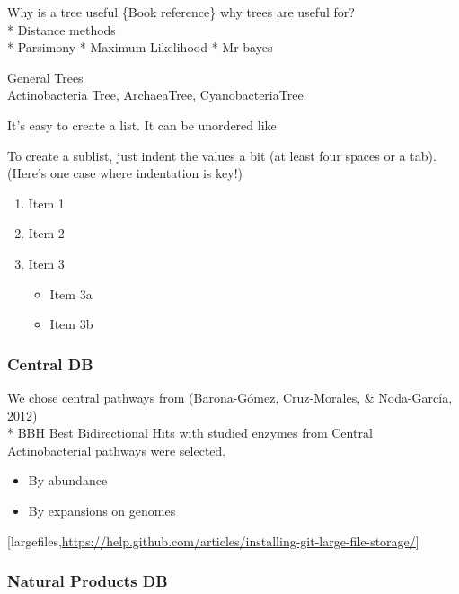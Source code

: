 \documentclass[12pt,twoside]{reedthesis}
\providecommand{\tightlist}{%
  \setlength{\itemsep}{0pt}\setlength{\parskip}{0pt}}
\begin{document}
  Why is a tree useful \{Book reference\} why trees are useful for?\\
  * Distance methods\\
  * Parsimony * Maximum Likelihood * Mr bayes
  
  General Trees\\
  Actinobacteria Tree, ArchaeaTree, CyanobacteriaTree.
  
  It's easy to create a list. It can be unordered like
  
  To create a sublist, just indent the values a bit (at least four spaces
  or a tab). (Here's one case where indentation is key!)
  
  \begin{enumerate}
  \def\labelenumi{\arabic{enumi}.}
  \tightlist
  \item
    Item 1
  \item
    Item 2
  \item
    Item 3
  
    \begin{itemize}
    \tightlist
    \item
      Item 3a
    \item
      Item 3b
    \end{itemize}
  \end{enumerate}
  
  \subsubsection{Central DB}\label{central-db}
  
  We chose central pathways from (Barona-Gómez, Cruz-Morales, \&
  Noda-García, 2012)\\
  * BBH Best Bidirectional Hits with studied enzymes from Central
  Actinobacterial pathways were selected.
  
  \begin{itemize}
  \item
    By abundance
  \item
    By expansions on genomes
  \end{itemize}
  
  {[}largefiles,\url{https://help.github.com/articles/installing-git-large-file-storage/}{]}
  
  \subsubsection{Natural Products DB}\label{natural-products-db}
  
\end{document}
